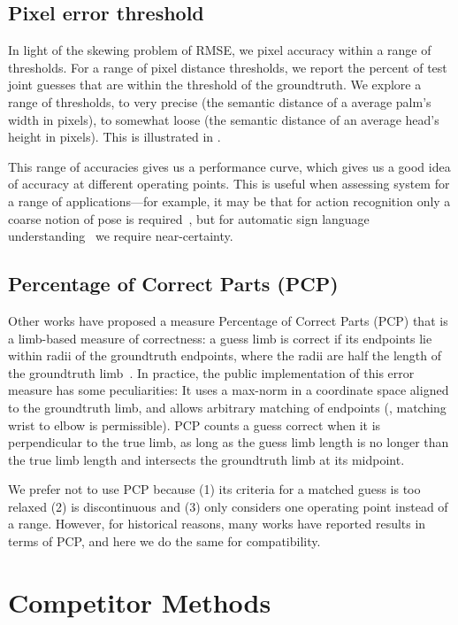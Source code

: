 \subsection{Pixel error threshold}  In light of the skewing problem of RMSE, we 
pixel accuracy within a range of thresholds.  For a range of pixel distance 
thresholds, we report the percent of test joint guesses that are within the 
threshold of the groundtruth.  We explore a range of thresholds, to very 
precise (the semantic distance of a average palm's width in pixels), to 
somewhat loose (the semantic distance of an average head's height in pixels).  
This is illustrated in .

This range of accuracies gives us a performance curve, which gives us a good 
idea of accuracy at different operating points.  This is useful when assessing 
system for a range of applications---for example, it may be that for action 
recognition only a coarse notion of pose is required~\citep{wang2011}, but for 
automatic sign language understanding~\citep{buehler2009} we require 
near-certainty.

\subsection{Percentage of Correct Parts (PCP)}  Other works have proposed a 
measure Percentage of Correct Parts (PCP) that is a limb-based measure of 
correctness: a guess limb is correct if its endpoints lie within radii of the 
groundtruth endpoints, where the radii are half the length of the groundtruth 
limb~\citep{ferrari08,eichner09}.  In practice, the public implementation of 
this error measure has some peculiarities: It uses a max-norm in a coordinate 
space aligned to the groundtruth limb, and allows arbitrary matching of 
endpoints (\eg, matching wrist to elbow is permissible).  PCP counts a guess 
correct when it is perpendicular to the true limb, as long as the guess limb 
length is no longer than the true limb length and intersects the groundtruth 
limb at its midpoint.  

We prefer not to use PCP because (1) its criteria for a matched guess is too 
relaxed (2) is discontinuous and (3) only considers one operating point instead 
of a range.  However, for historical reasons, many works have reported results 
in terms of PCP, and here we do the same for compatibility.

\section{Competitor Methods}

